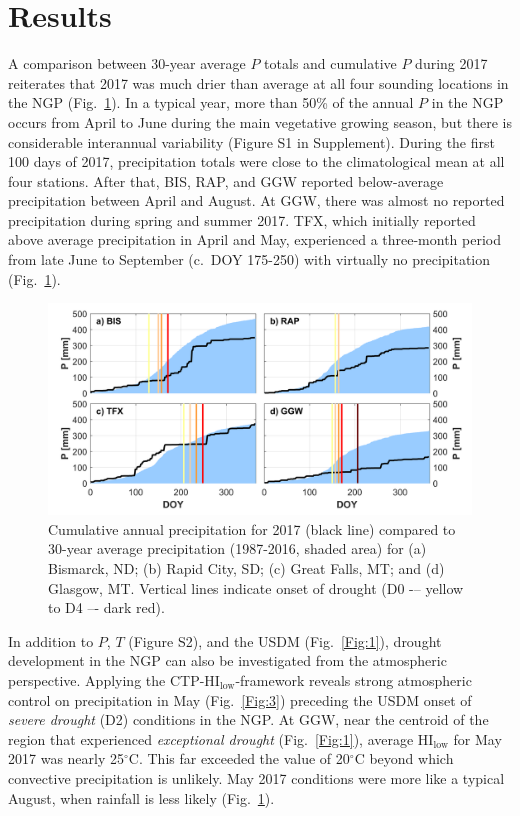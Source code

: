 \documentclass[hess, manuscript]{copernicus}
\begin{document}
\section{Results}
A comparison between 30-year average $P$ totals and cumulative $P$ during 2017 reiterates that 2017 was much drier than average at all four sounding locations in the NGP (Fig.~\ref{Fig:2}). In a typical year, more than 50\% of the annual $P$ in the NGP occurs from April to June during the main vegetative growing season, but there is considerable interannual variability (Figure S1 in Supplement). During the first 100 days of 2017, precipitation totals were close to the climatological mean at all four stations. After that, BIS, RAP, and GGW reported below-average precipitation between April and August. At GGW, there was almost no reported precipitation during spring and summer 2017. TFX, which initially reported above average precipitation in April and May, experienced a three-month period from late June to September (c.~DOY 175-250) with virtually no precipitation (Fig.~\ref{Fig:2}). 
%
\begin{figure}[t]
\includegraphics[width=12cm]{./Figures/Climatology_P.png}
\caption{Cumulative annual precipitation for 2017 (black line) compared to 30-year average precipitation (1987-2016, shaded area) for (a) Bismarck, ND; (b) Rapid City, SD; (c) Great Falls, MT; and (d) Glasgow, MT. Vertical lines indicate onset of drought (D0 -– yellow to D4 –- dark red). }\label{Fig:2}
\end{figure}

In addition to $P$, $T$ (Figure S2), and the USDM (Fig.~\ref{Fig:1}), drought development in the NGP can also be investigated from the atmospheric perspective. Applying the CTP-$\mathrm{HI_{low}}$-framework \citep{Findell_2003a, Findell_2003b} reveals strong atmospheric control on precipitation in May (Fig.~\ref{Fig:3}) preceding the USDM onset of \emph{severe drought} (D2) conditions in the NGP. At GGW, near the centroid of the region that experienced \emph{exceptional drought} (Fig.~\ref{Fig:1}), average $\mathrm{HI_{low}}$ for May 2017 was nearly 25$\mathrm{^\circ}$C. This far exceeded the value of 20$\mathrm{^\circ}$C beyond which convective precipitation is unlikely. May 2017 conditions were more like a typical August, when rainfall is less likely (Fig.~\ref{Fig:2}). 
\end{document}
